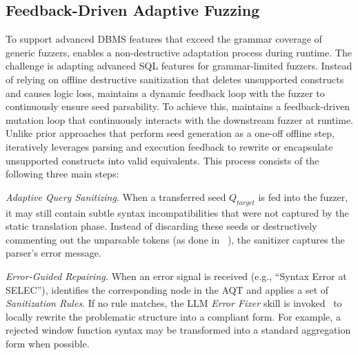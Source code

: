 \documentclass[sigconf,review,anonymous]{acmart}
\begin{document}
\subsection{Feedback-Driven Adaptive Fuzzing}%
\label{sec:mutation_loop}
To support advanced DBMS features that exceed the grammar coverage of generic fuzzers, \tool{} enables a non-destructive adaptation process during runtime. 
The challenge is adapting advanced SQL features for grammar-limited fuzzers.
Instead of relying on offline destructive sanitization that deletes unsupported constructs and causes logic loss, \tool{} maintains a dynamic feedback loop with the fuzzer to continuously ensure seed parsability. 
To achieve this, \tool{} maintains a feedback-driven mutation loop that continuously interacts with the downstream fuzzer at runtime. Unlike prior approaches that perform seed generation as a one-off offline step, \tool{} iteratively leverages parsing and execution feedback to rewrite or encapsulate unsupported constructs into valid equivalents. 
This process consists of the following three main steps:







\textit{Adaptive Query Sanitizing. }
When a transferred seed $Q_{target}$ is fed into the fuzzer, it may still contain subtle syntax incompatibilities that were not captured by the static translation phase. Instead of discarding these seeds or destructively commenting out the unparsable tokens (as done in \sedar{}~\cite{fu2024sedar}), the sanitizer captures the parser's error message.

\textit{Error-Guided Repairing.} When an error signal is received (e.g., ``Syntax Error at SELEC''), \tool{} identifies the corresponding node in the AQT and applies a set of \textit{Sanitization Rules}. If no rule matches, the LLM \textit{Error Fixer} skill is invoked~\cite{fan2023automated} to locally rewrite the problematic structure into a compliant form. For example, a rejected window function syntax may be transformed into a standard aggregation form when possible.
\end{document}
